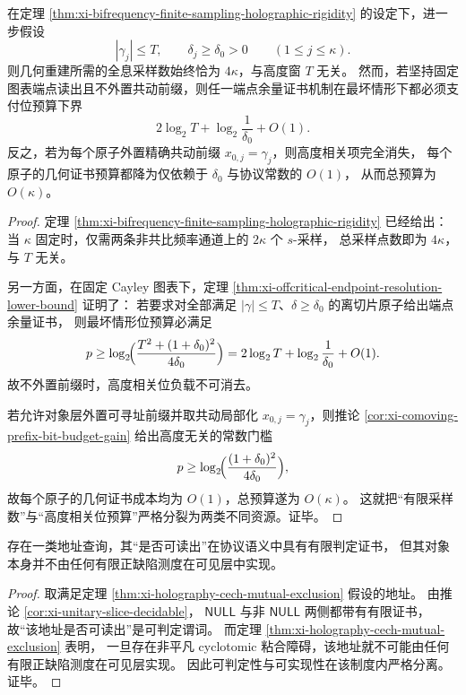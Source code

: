 \begin{theorem}[有限采样数与高度相关位预算的裂解]\label{thm:xi-finite-sampling-vs-height-bit-splitting}
在定理 \ref{thm:xi-bifrequency-finite-sampling-holographic-rigidity} 的设定下，进一步假设
\[
|\gamma_j|\le T,
\qquad
\delta_j\ge \delta_0>0
\qquad (1\le j\le \kappa).
\]
则几何重建所需的全息采样数始终恰为 \(4\kappa\)，与高度窗 \(T\) 无关。
然而，若坚持固定图表端点读出且不外置共动前缀，则任一端点余量证书机制在最坏情形下都必须支付位预算下界
\[
2\log_2 T+\log_2\frac{1}{\delta_0}+O(1).
\]
反之，若为每个原子外置精确共动前缀 \(x_{0,j}=\gamma_j\)，则高度相关项完全消失，
每个原子的几何证书预算都降为仅依赖于 \(\delta_0\) 与协议常数的 \(O(1)\)，
从而总预算为 \(O(\kappa)\)。
\end{theorem}
\begin{proof}
定理 \ref{thm:xi-bifrequency-finite-sampling-holographic-rigidity} 已经给出：
当 \(\kappa\) 固定时，仅需两条非共比频率通道上的 \(2\kappa\) 个 \(s\)-采样，
总采样点数即为 \(4\kappa\)，与 \(T\) 无关。

另一方面，在固定 Cayley 图表下，定理
\ref{thm:xi-offcritical-endpoint-resolution-lower-bound} 证明了：
若要求对全部满足 \(|\gamma|\le T\)、\(\delta\ge\delta_0\) 的离切片原子给出端点余量证书，
则最坏情形位预算必满足
\[
p\ge
\log_2\!\Bigl(\frac{T^2+(1+\delta_0)^2}{4\delta_0}\Bigr)
=
2\log_2 T+\log_2\frac{1}{\delta_0}+O(1).
\]
故不外置前缀时，高度相关位负载不可消去。

若允许对象层外置可寻址前缀并取共动局部化 \(x_{0,j}=\gamma_j\)，则推论
\ref{cor:xi-comoving-prefix-bit-budget-gain} 给出高度无关的常数门槛
\[
p\ge \log_2\!\Bigl(\frac{(1+\delta_0)^2}{4\delta_0}\Bigr),
\]
故每个原子的几何证书成本均为 \(O(1)\)，总预算遂为 \(O(\kappa)\)。
这就把“有限采样数”与“高度相关位预算”严格分裂为两类不同资源。证毕。
\end{proof}

\begin{corollary}[可判定而不可实现的查询类]\label{cor:xi-decidable-but-unrealizable-visible-query}
存在一类地址查询，其“是否可读出”在协议语义中具有有限判定证书，
但其对象本身并不由任何有限正缺陷测度在可见层中实现。
\end{corollary}
\begin{proof}
取满足定理 \ref{thm:xi-holography-cech-mutual-exclusion} 假设的地址。
由推论 \ref{cor:xi-unitary-slice-decidable}，
\(\mathsf{NULL}\) 与非 \(\mathsf{NULL}\) 两侧都带有有限证书，
故“该地址是否可读出”是可判定谓词。
而定理 \ref{thm:xi-holography-cech-mutual-exclusion} 表明，
一旦存在非平凡 cyclotomic 粘合障碍，该地址就不可能由任何有限正缺陷测度在可见层实现。
因此可判定性与可实现性在该制度内严格分离。证毕。
\end{proof}

\endinput

